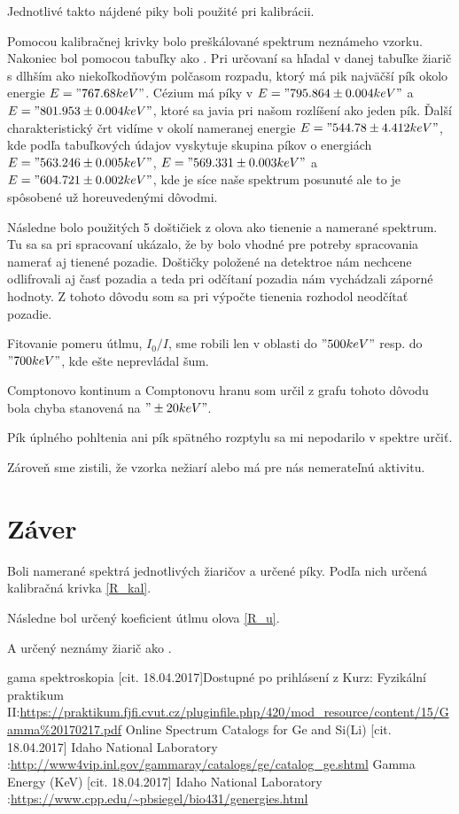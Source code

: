 \documentclass[10pt]{scrartcl}
\begin{document}
Jednotlivé takto nájdené piky boli použité pri kalibrácii. 

Pomocou kalibračnej krivky bolo preškálované spektrum neznámeho vzorku. Nakoniec bol pomocou tabuľky \cite{C_3} ako . 
Pri určovaní sa hľadal v danej tabuľke žiarič s dlhším ako niekoľkodňovým polčasom rozpadu, 
ktorý má pik najväčší pík okolo energie $E="767.68 keV"$. 
Cézium  má píky v $E="795.864\pm0.004 keV"$ a $E="801.953\pm0.004 keV"$, 
ktoré sa javia pri našom rozlíšení ako jeden pík. 
Ďalší charakteristický črt vidíme v okolí nameranej energie $E="544.78\pm4.412 keV"$, 
kde podľa tabuľkových údajov vyskytuje skupina píkov o energiách 
$E ="563.246\pm0.005 keV"$, $E ="569.331\pm0.003 keV"$ a $E ="604.721\pm0.002 keV"$, 
kde je síce naše spektrum posunuté ale to je spôsobené už horeuvedenými dôvodmi.

Následne bolo použitých 5 doštičiek z olova ako tienenie a namerané spektrum. Tu sa sa pri spracovaní ukázalo, že by bolo vhodné pre potreby spracovania namerať aj tienené pozadie. Doštičky položené na detektroe nám nechcene odlifrovali aj časť pozadia a teda pri odčítaní pozadia nám vychádzali záporné hodnoty. Z tohoto dôvodu som sa pri výpočte tienenia rozhodol neodčítať pozadie. 

Fitovanie pomeru útlmu, $I_0/I$, sme robili len v oblasti do $"500 keV"$ resp. do $"700 keV"$, kde ešte neprevládal šum. 

Comptonovo kontinum a Comptonovu hranu som určil z grafu tohoto dôvodu bola chyba stanovená na $"\pm20 keV"$. 

Pík úplného pohltenia ani pík spätného rozptylu sa mi nepodarilo v spektre určiť.

Zároveň sme zistili, že vzorka  nežiarí alebo má pre nás nemerateľnú aktivitu. 

\section{Záver}
Boli namerané spektrá jednotlivých žiaričov a určené píky. Podľa nich určená kalibračná krivka \ref{R_kal}.

Následne bol určený koeficient útlmu olova \ref{R_u}. 

A určený neznámy žiarič ako .


\begin{thebibliography}{2}
gama spektroskopia [cit. 18.04.2017]Dostupné po prihlásení z Kurz: Fyzikální praktikum II:\url{https://praktikum.fjfi.cvut.cz/pluginfile.php/420/mod_resource/content/15/Gamma%20170217.pdf}
Online Spectrum Catalogs for Ge and Si(Li) [cit. 18.04.2017] Idaho National Laboratory :\url{http://www4vip.inl.gov/gammaray/catalogs/ge/catalog_ge.shtml}
Gamma Energy (KeV) [cit. 18.04.2017] Idaho National Laboratory :\url{https://www.cpp.edu/~pbsiegel/bio431/genergies.html}




\end{thebibliography}
\end{document}
